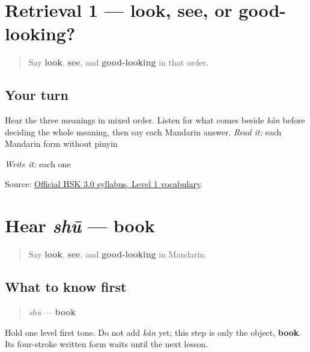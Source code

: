\section[Practice]{Retrieval 1 — look, see, or good-looking?}

\label{lesson:ZH-R18-looking-three-r1}



\begin{quote}
Say \textbf{look}, \textbf{see}, and \textbf{good-looking} in that order.
\end{quote}

\subsection*{Your turn}
Hear the three meanings in mixed order. Listen for what comes beside \emph{kàn} before deciding the whole meaning, then say each Mandarin answer. \emph{Read it:} each Mandarin form without pinyin

\emph{Write it:} each one

\begin{tcolorbox}[breakable,colback=teal!4,colframe=teal!35!black,title={Before you move on}]
Source: \href{https://hsk.cn-bj.ufileos.com/3.0/\%E6\%96\%B0\%E7\%89\%88HSK\%E8\%80\%83\%E8\%AF\%95\%E5\%A4\%A7\%E7\%BA\%B21219.pdf}{Official HSK 3.0 syllabus, Level 1 vocabulary}.
\end{tcolorbox}
\section[shū]{Hear \emph{shū} — book}

\label{lesson:ZH-C18-hear-shu}



\begin{quote}
Say \textbf{look}, \textbf{see}, and \textbf{good-looking} in Mandarin.
\end{quote}

\subsection*{What to know first}
\begin{quote}
\emph{shū} — \textbf{book}
\end{quote}

Hold one level first tone. Do not add \emph{kàn} yet; this step is only the object, \textbf{book}. Its four-stroke written form waits until the next lesson.

